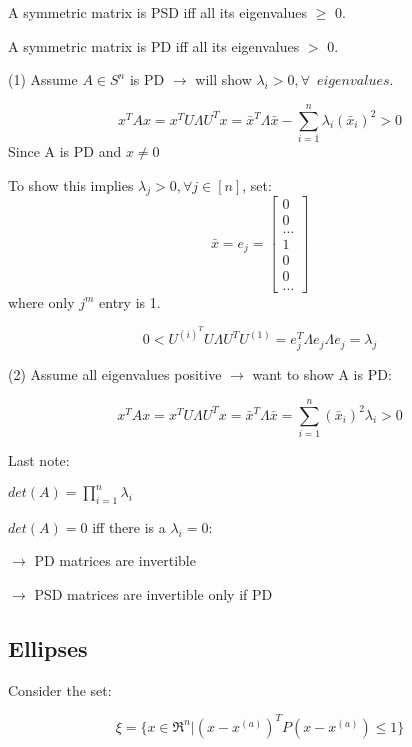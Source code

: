 A symmetric matrix is PSD iff all its eigenvalues $\geq$ 0.

A symmetric matrix is PD iff all its eigenvalues $>$ 0.


(1) Assume $A\in S^n$ is PD $\rightarrow$ will show $\lambda_i > 0, \forall\,\,\, eigenvalues$.   

\begin{equation*}
x^TAx = x^TU\Lambda U^Tx = \bar{x}^T\Lambda\bar{x} - \sum^n_{i=1}\lambda_i(\bar{x}_i)^2 >0
\end{equation*}
Since A is PD and $x\neq 0$

To show this implies $\lambda_j > 0, \forall j\in [n]$, set:
$$\bar{x} = e_j = 
\left[
\begin{matrix}
0\\
0\\
...\\
1\\
0\\
0\\
...
\end{matrix}
\right]
$$
where only $j^m$ entry is 1.

\begin{equation*}
0 < U^{(i)^T} U\Lambda U^TU^{(1)} =e_j^T\Lambda e_j \Lambda e_j = \lambda_j
\end{equation*}



(2) Assume all eigenvalues positive $\rightarrow$ want to show A is PD:

\begin{equation*}
x^TAx =x^TU\Lambda U^Tx = \bar{x}^T\Lambda \bar{x} = \sum^n_{i=1}(\bar{x}_i)^2\lambda_i > 0
\end{equation*}

Last note:

$det(A) = \prod^n_{i=1}\lambda_i$

$det(A) = 0$ iff there is a $\lambda_i = 0$:

$\rightarrow$ PD matrices are invertible

$\rightarrow$ PSD matrices are invertible only if PD




\subsection{Ellipses} 

Consider the set:

\begin{equation*}
\xi = \{x\in \Re^n | (x - x^{(a)})^T P(x - x^{(a)}) \leq 1 \}
\end{equation*}

